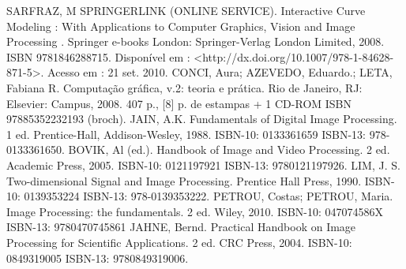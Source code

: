 {SARFRAZ, M SPRINGERLINK (ONLINE SERVICE). Interactive Curve
Modeling : With Applications to Computer Graphics, Vision and Image
Processing . Springer e-books London: Springer-Verlag London Limited, 2008.
ISBN 9781846288715. Disponível em :
<http://dx.doi.org/10.1007/978-1-84628-871-5>. Acesso em : 21 set. 2010.
\newline \newline 
CONCI, Aura; AZEVEDO, Eduardo.; LETA, Fabiana R. Computação gráfica,
v.2: teoria e prática. Rio de Janeiro, RJ: Elsevier: Campus, 2008. 407 p., [8] p.
de estampas + 1 CD-ROM ISBN 97885352232193 (broch).
\newline \newline 
JAIN, A.K. Fundamentals of Digital Image Processing. 1 ed. Prentice-Hall,
Addison-Wesley, 1988. ISBN-10: 0133361659 ISBN-13: 978-0133361650.
\newline \newline 
BOVIK, Al (ed.). Handbook of Image and Video Processing. 2 ed. Academic
Press, 2005. ISBN-10: 0121197921 ISBN-13: 9780121197926.
\newline \newline 
LIM, J. S. Two-dimensional Signal and Image Processing. Prentice Hall Press,
1990. ISBN-10: 0139353224 ISBN-13: 978-0139353222.
\newline \newline 
PETROU, Costas; PETROU, Maria. Image Processing: the fundamentals. 2 ed.
Wiley, 2010. ISBN-10: 047074586X ISBN-13: 9780470745861
\newline \newline 
JAHNE, Bernd. Practical Handbook on Image Processing for Scientific
Applications. 2 ed. CRC Press, 2004. ISBN-10: 0849319005 ISBN-13:
9780849319006.
}


